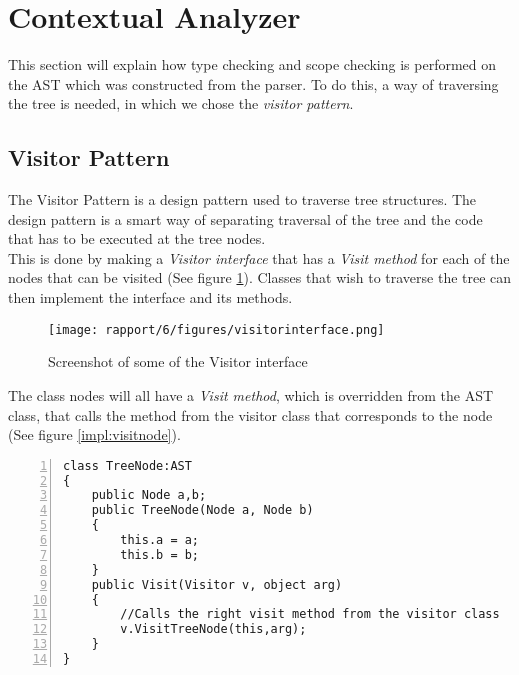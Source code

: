 \section{Contextual Analyzer}
	This section will explain how type checking and scope checking is performed on the AST which was constructed from the parser.
	To do this, a way of traversing the tree is needed, in which we chose the \textit{visitor pattern}.
	
	\subsection{Visitor Pattern}\label{impl:visitorinterface}
		The Visitor Pattern is a design pattern used to traverse tree structures. 
		The design pattern is a smart way of separating traversal of the tree and the code that has to be executed at the tree nodes. \\
		This is done by making a {\it Visitor interface} that has a {\it Visit method} for each of the nodes that 
		can be visited (See figure \ref{impl:visitor}). Classes that wish to traverse the tree can then implement the interface and its methods.
		\begin{figure}[H]
		\center
			\texttt{[image: rapport/6/figures/visitorinterface.png]}
			\caption{Screenshot of some of the Visitor interface}
			\label{impl:visitor}
		\end{figure}
	
		The class nodes will all have a {\it Visit method}, 
		which is overridden from the AST class, that calls the method from the visitor class 
		that corresponds to the node (See figure \ref{impl:visitnode}). 
			\begin{lstlisting}[basicstyle=\small\sffamily,
					keywords={break,case,const,continue,default,else,enum,
					for,if,return,switch,while,do,long,void,int,float,double,
					char,struct,typedef,include,size\_t},
					keywordstyle={\color{blue}},
					comment={[l]{//}}, morecomment={[s]{/*}{*/}}, commentstyle=\itshape,
					columns={[l]flexible}, numbers=left, numberstyle=\tiny,
					frameround=fftt, frame=shadowbox, captionpos=b,
					caption={Example of a node class with a Visit method},
					label=impl:visitnode]
class TreeNode:AST
{
	public Node a,b;
	public TreeNode(Node a, Node b)
	{
		this.a = a;
		this.b = b;
	}
	public Visit(Visitor v, object arg)
	{
		//Calls the right visit method from the visitor class
		v.VisitTreeNode(this,arg);
	}
}
			 \end{lstlisting}
	
